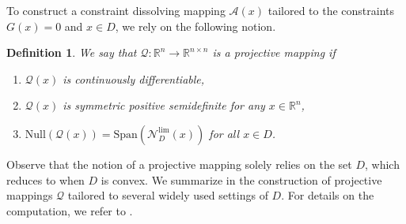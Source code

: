 \documentclass[11pt,a4paper,reqno]{amsart}
\newtheorem{definition}[theorem]{Definition}
\begin{document}
{To construct a constraint dissolving mapping $\mathcal A(x)$ tailored to the constraints $G(x)=0$ and $x\in D$, we rely on the following notion. 
\begin{definition}\label{Ass:Q}
We say that $\mathcal Q: \mathbb R^n \to \mathbb R^{n \times n}$ is a projective mapping if
\begin{enumerate}[label=(\alph*)]
    \item \label{item:Qa}$\mathcal Q(x)$ is continuously differentiable,
    \item \label{item:Qb}$\mathcal Q(x)$ is symmetric positive semidefinite for any $x\in \mathbb R^n$,
    \item \label{item:Qc}$\text{Null} \left(\mathcal Q(x)\right)= \text{Span} \left(\mathcal N^{\text{lim}}_D(x) \right) $ for all $x\in D$.
\end{enumerate}
\end{definition}

Observe that the notion of a projective mapping solely relies on the set $D$, which reduces to \cite[Assumption~4.3]{xiao2026exact} when $D$ is convex. %
We summarize in  the construction of projective mappings $\mathcal Q$ tailored to several widely used settings of $D$. For details on the computation, we refer to .

}
\end{document}
